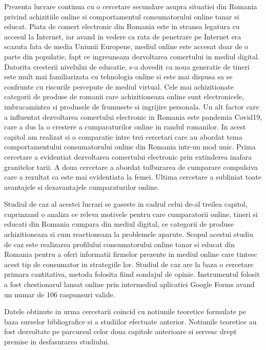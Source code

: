 \documentclass[a4paper, 12pt]{article}
\begin{document}
	\quad Prezenta lucrare continua cu o cercetare secundare asupra situatiei din Romania privind achizitiile online si comportamentul consumatorului online tanar si educat. Piata de comert electronic din Romania este in stransa legatura cu accesul la Internet, iar avand in vedere ca rata de penetrare pe Internet era scazuta fata de media Uniunii Europene, mediul online este accesat doar de o parte din populatie, fapt ce ingreuneaza dezvoltarea comertului  in mediul digital. Datorita cresterii nivelului de educatie, s-a dovedit ca noua generatie de tineri este mult mai familiarizata cu tehnologia online si este mai dispusa sa se confrunte cu riscurile percepute de mediul virtual. Cele mai achizitionate categorii de produse de romanii care achizitioneaza online sunt electronicele, imbracamintea si produsele de frumusete si ingrijire personala. Un alt factor care a influentat dezvoltarea comertului electronic in Romania este pandemia Covid19, care a dus la o crestere a cumparaturilor online in randul romanilor. In acest capitol am realizat si o comparatie intre trei cercetari care au abordat tema comportamentului consumatorului online din Romania intr-un mod unic. Prima cercetare a evidentiat dezvoltarea comertului electronic prin extinderea inafara granitelor tarii. A doua cercetare a abordat tulburarea de cumparare compulsiva care a rezultat ca este mai evidentiata la femei. Ultima cercetare a subliniat toate avantajele si dezavantajele cumparaturilor online.
	
	\quad Studiul de caz al acestei lucrari se gaseste in cadrul celui de-al treilea capitol, cuprinzand o analiza ce releva motivele pentru care cumparatorii online, tineri si educati din Romania cumpara din mediul digital, ce categorii de produse achizitioneaza si cum reactioneaza la problemele aparute. Scopul acestui studiu de caz este realizarea profilului consumatorului online tanar si educat din Romania pentru a oferi informatii firmelor prezente in mediul online care tintesc acest tip de consumator in strategiile lor. Studiul de caz are la baza o cercetare primara cantitativa, metoda folosita fiind sondajul de opinie. Instrumentul folosit a fost chestionarul lansat online prin intermediul aplicatiei Google Forms avand un numar de 106 raspunsuri valide.
	
	\quad Datele obtinute in urma cercetarii coincid cu notiunile teoretice formulate pe baza surselor bibliografice si a studiilor efectuate anterior. Notiunile teoretice au fost dezvoltate pe parcursul celor doua capitole anterioare si servesc drept premise in desfasurarea studiului.
	
\end{document}
